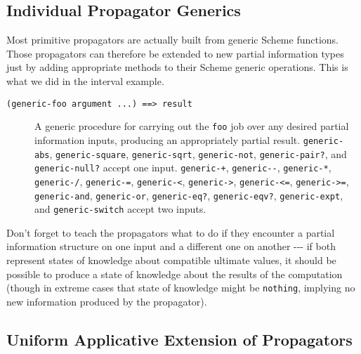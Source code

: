 \documentclass[12pt,letterpaper,english]{article}
\begin{document}

\hypertarget{individual-propagator-generics}{}
\subsection{Individual Propagator Generics}
\label{individual-propagator-generics}

Most primitive propagators are actually built from generic Scheme functions.
Those propagators can therefore be extended to new
partial information types just by adding appropriate methods to their
Scheme generic operations.  This is what we did in the interval example.
\begin{description}
\item[{\texttt{(generic-foo argument ...)  ==>  result}}] \leavevmode 
A generic procedure for carrying out the \texttt{foo} job over any
desired partial information inputs, producing an appropriately
partial result.  \texttt{generic-abs}, \texttt{generic-square},
\texttt{generic-sqrt}, \texttt{generic-not}, \texttt{generic-pair?}, and
\texttt{generic-null?} accept one input.
\texttt{generic-+}, \texttt{generic-{}-}, \texttt{generic-*}, \texttt{generic-/},
\texttt{generic-=}, \texttt{generic-<}, \texttt{generic->}, \texttt{generic-<=},
\texttt{generic->=}, \texttt{generic-and}, \texttt{generic-or}, \texttt{generic-eq?},
\texttt{generic-eqv?}, \texttt{generic-expt}, and \texttt{generic-switch} accept two inputs.

\end{description}

Don't forget to teach the propagators what to do if they encounter
a partial information structure on one input and a different one on
another -{}-{}- if both represent states of knowledge about compatible
ultimate values, it should be possible to produce a state of knowledge
about the results of the computation (though in extreme cases that
state of knowledge might be \texttt{nothing}, implying no new information
produced by the propagator).



\hypertarget{uniform-applicative-extension-of-propagators}{}
\subsection{Uniform Applicative Extension of Propagators}
\label{uniform-applicative-extension-of-propagators}
\end{document}
